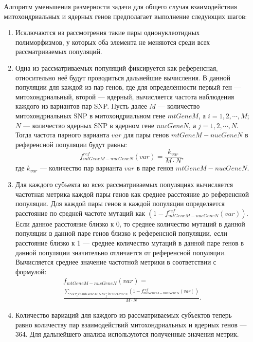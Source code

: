 Алгоритм уменьшения размерности задачи для общего случая взаимодействия митохондриальных и ядерных генов предполагает выполнение следующих шагов:
\begin{enumerate}
	\item Исключаются из рассмотрения такие пары однонуклеотидных полиморфизмов, у которых оба элемента не меняются среди всех рассматриваемых популяций.
	\item Одна из рассматриваемых популяций фиксируется как референсная, относительно неё будут проводиться дальнейшие вычисления. В данной популяции для каждой из пар генов, где для определённости первый ген --- митохондриальный, второй --- ядерный, вычисляется частота наблюдения каждого из вариантов пар SNP. Пусть далее $M$ --- количество митохондриальных SNP в митохондриальном гене $mtGene M$, а $i = 1, 2, \cdots, M$; $N$ --- количество ядерных SNP в ядерном гене $nucGene N$, а $j = 1, 2, \cdots, N$. Тогда частота парного варианта $var$ для пары генов $mtGene M-nucGene N$ в референсной популяции будут равны:
	\begin{equation}
	\label{eq:f_ref_mt_nuc}
	f_{mtGene M-nucGene N}^{ref} (var) = \frac{k_{var}}{M\cdot N},
	\end{equation}
	где $k_{var}$ --- количество пар варианта $var$ в паре генов $mtGene M-nucGene N$.
	\item Для каждого субъекта во всех рассматриваемых популяциях вычисляется частотная метрика каждой пары генов как среднее расстояние до референсной популяции. Для каждой пары генов в каждой популяции определяется расстояние по средней частоте мутаций как $\left(1 - f_{mtGene M-nucGene N}^{ref} (var)\right)$. Если данное расстояние близко к 0, то среднее количество мутаций в данной популяции в данной паре генов близко к референсной популяции, если расстояние близко к 1 --- среднее количество мутаций в данной паре генов в данной популяции значительно отличается от референсной популяции. Вычисляется среднее значение частотной метрики в соответствии с формулой:
	\begin{equation}
	\label{eq:f_mt_nuc}
	\begin{gathered}
	f_{mtGene M-nucGene N} (var) =\\ \frac{\sum_{SNP_i\,in\,mtGene M, SNP_j\,in\,nucGene N} \left(1 - f_{mtGene M-nucGene N}^{ref} (var)\right)}{M\cdot N}.
	\end{gathered}
	\end{equation}
	\item Количество вариаций для каждого из рассматриваемых субъектов теперь равно количеству пар взаимодействий митохондриальных и ядерных генов --- 364. Для дальнейшего анализа используются полученные значения метрик.
\end{enumerate}

